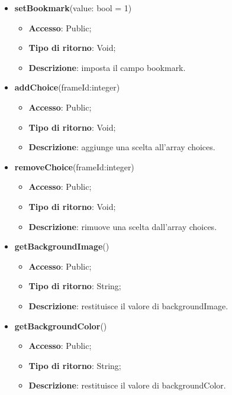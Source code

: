 {{\begin{itemize}
\begin{itemize}
				\item \textbf{Accesso}: Public;
				\item \textbf{Tipo di ritorno}: Bool;
				\item \textbf{Descrizione}: ritorna il valore del campo bookmark.
			\end{itemize}
			\item \textbf{setBookmark}(value: bool = 1)
			\begin{itemize}
				\item \textbf{Accesso}: Public;
				\item \textbf{Tipo di ritorno}: Void;
				\item \textbf{Descrizione}: imposta il campo bookmark.
			\end{itemize}
			\item \textbf{addChoice}(frameId:integer)
			\begin{itemize}
				\item \textbf{Accesso}: Public;
				\item \textbf{Tipo di ritorno}: Void;
				\item \textbf{Descrizione}: aggiunge una scelta all’array choices.
			\end{itemize}
			\item \textbf{removeChoice}(frameId:integer)
			\begin{itemize}
				\item \textbf{Accesso}: Public;
				\item \textbf{Tipo di ritorno}: Void;
				\item \textbf{Descrizione}: rimuove una scelta dall’array choices.
			\end{itemize}
			\item \textbf{getBackgroundImage}()
			\begin{itemize}
				\item \textbf{Accesso}: Public;
				\item \textbf{Tipo di ritorno}: String;
				\item \textbf{Descrizione}: restituisce il valore di backgroundImage.
			\end{itemize}
			\item \textbf{getBackgroundColor}()
			\begin{itemize}
				\item \textbf{Accesso}: Public;
				\item \textbf{Tipo di ritorno}: String;
				\item \textbf{Descrizione}: restituisce il valore di backgroundColor.

\end{itemize}
\end{itemize}}}
